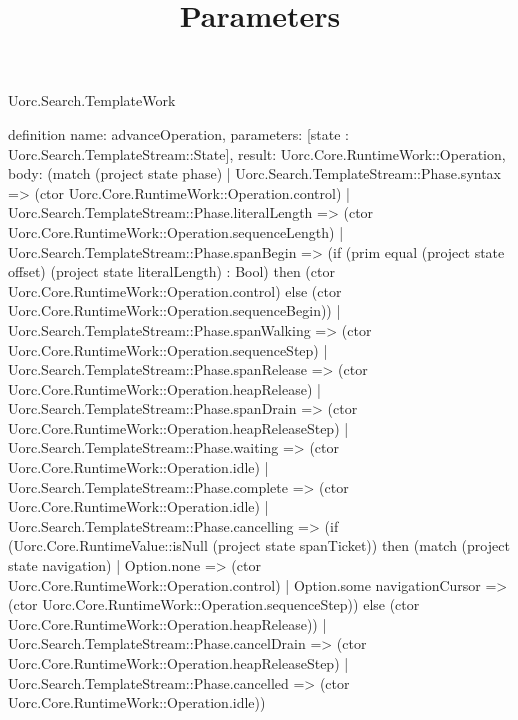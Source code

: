 \begin{lexlean}{Uorc.Search.TemplateWork}
\title{Parameters}
\begin{semanticmodule}
definition{
  name: advanceOperation,
  parameters: [state : Uorc.Search.TemplateStream::State],
  result: Uorc.Core.RuntimeWork::Operation,
  body: (match (project state phase)
    | Uorc.Search.TemplateStream::Phase.syntax => (ctor Uorc.Core.RuntimeWork::Operation.control)
    | Uorc.Search.TemplateStream::Phase.literalLength => (ctor Uorc.Core.RuntimeWork::Operation.sequenceLength)
    | Uorc.Search.TemplateStream::Phase.spanBegin => (if (prim equal (project state offset) (project state literalLength) : Bool) then (ctor Uorc.Core.RuntimeWork::Operation.control) else (ctor Uorc.Core.RuntimeWork::Operation.sequenceBegin))
    | Uorc.Search.TemplateStream::Phase.spanWalking => (ctor Uorc.Core.RuntimeWork::Operation.sequenceStep)
    | Uorc.Search.TemplateStream::Phase.spanRelease => (ctor Uorc.Core.RuntimeWork::Operation.heapRelease)
    | Uorc.Search.TemplateStream::Phase.spanDrain => (ctor Uorc.Core.RuntimeWork::Operation.heapReleaseStep)
    | Uorc.Search.TemplateStream::Phase.waiting => (ctor Uorc.Core.RuntimeWork::Operation.idle)
    | Uorc.Search.TemplateStream::Phase.complete => (ctor Uorc.Core.RuntimeWork::Operation.idle)
    | Uorc.Search.TemplateStream::Phase.cancelling => (if (Uorc.Core.RuntimeValue::isNull (project state spanTicket)) then (match (project state navigation)
      | Option.none => (ctor Uorc.Core.RuntimeWork::Operation.control)
      | Option.some navigationCursor => (ctor Uorc.Core.RuntimeWork::Operation.sequenceStep)) else (ctor Uorc.Core.RuntimeWork::Operation.heapRelease))
    | Uorc.Search.TemplateStream::Phase.cancelDrain => (ctor Uorc.Core.RuntimeWork::Operation.heapReleaseStep)
    | Uorc.Search.TemplateStream::Phase.cancelled => (ctor Uorc.Core.RuntimeWork::Operation.idle))
}


\end{semanticmodule}
\end{lexlean}
